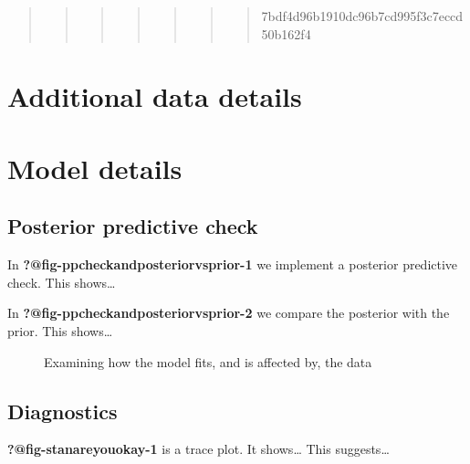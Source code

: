 \documentclass[
  letterpaper,
  DIV=11,
  numbers=noendperiod]{scrartcl}
\begin{document}
\begin{quote}
\begin{quote}
\begin{quote}
\begin{quote}
\begin{quote}
\begin{quote}
\begin{quote}
7bdf4d96b1910dc96b7cd995f3c7eccd50b162f4
\end{quote}
\end{quote}
\end{quote}
\end{quote}
\end{quote}
\end{quote}
\end{quote}

\section{Additional data details}\label{additional-data-details}

\section{Model details}\label{sec-model-details}

\subsection{Posterior predictive
check}\label{posterior-predictive-check}

In \textbf{?@fig-ppcheckandposteriorvsprior-1} we implement a posterior
predictive check. This shows\ldots{}

In \textbf{?@fig-ppcheckandposteriorvsprior-2} we compare the posterior
with the prior. This shows\ldots{}

\begin{figure}

\begin{minipage}{0.50\linewidth}
Examining how the model fits, and is affected by, the
data\end{minipage}%

\end{figure}%

\subsection{Diagnostics}\label{diagnostics}

\textbf{?@fig-stanareyouokay-1} is a trace plot. It shows\ldots{} This
suggests\ldots{}
\end{document}

